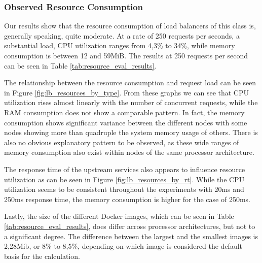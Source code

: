 \documentclass[draft,final]{vutinfth} %
\begin{document}
\subsubsection{Observed Resource Consumption}
Our results show that the resource consumption of load balancers of this class is, generally speaking, quite moderate.
At a rate of 250 requests per seconds, a substantial load, CPU utilization ranges from 4,3\% to 34\%, while memory consumption is between 12 and 59MiB.
The results at 250 requests per second can be seen in Table \ref{tab:resource_eval_results}.

The relationship between the resource consumption and request load can be seen in Figure \ref{fig:lb_resources_by_type}.
From these graphs we can see that CPU utilization rises almost linearly with the number of concurrent requests, while the RAM consumption does not show a comparable pattern.
In fact, the memory consumption shows significant variance between the different nodes with some nodes showing more than quadruple the system memory usage of others.
There is also no obvious explanatory pattern to be observed, as these wide ranges of memory consumption also exist within nodes of the same processor architecture.

The response time of the upstream services also appears to influence resource utilization as can be seen in Figure \ref{fig:lb_resources_by_rt}.
While the CPU utilization seems to be consistent throughout the experiments with 20ms and 250ms response time, the memory consumption is higher for the case of 250ms.

Lastly, the size of the different Docker images, which can be seen in Table \ref{tab:resource_eval_results}, does differ across processor architectures, but not to a significant degree.
The difference between the largest and the smallest images is 2,28Mib, or 8\% to 8,5\%, depending on which image is considered the default basis for the calculation.
\end{document}
